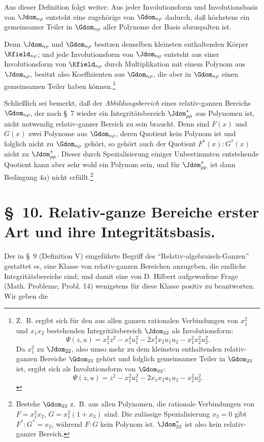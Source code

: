 \documentclass[11pt]{article}
\begin{document}
Aus dieser Definition folgt weiter: Aus jeder Involutionsform und Involutionsbasis von $\Jdom_{n\rho}$ entsteht eine zugehörige von $\Gdom_{n\rho}$ dadurch, daß höchstens ein gemeinsamer Teiler in $\Gdom_{n\rho}$ aller Polynome der Basis abzuspalten ist.

Denn $\Jdom_{n\rho}$ und $\Gdom_{n\rho}$ besitzen denselben kleinsten enthaltenden Körper $\Kfield_{n\rho}$; und jede Involutionsform von $\Jdom_{n\rho}$ entsteht aus einer Involutionsform von $\Kfield_{n\rho}$ durch Multiplikation mit einem Polynom aus $\Jdom_{n\rho}$, besitzt also Koeffizienten aus $\Gdom_{n\rho}$, die aber in $\Gdom_{n\rho}$ einen gemeinsamen Teiler haben können.\footnote{Z.~B. ergibt sich für den aus allen ganzen rationalen Verbindungen von $x_1^2$ und $x_1x_2$ bestehenden Integritätsbereich $\Jdom_{22}$ als Involutionsform:
\[
\Psi(z,u)=x_1^2z^2-x_1^4u_1^2-2x_1^3x_2u_1u_2-x_1^2x_2^2u_2^2.
\]
Da $x_1^2$ zu $\Jdom_{22}$, also umso mehr zu dem kleinsten enthaltenden relativ-ganzen Bereiche $\Gdom_{22}$ gehört und folglich gemeinsamer Teiler in $\Gdom_{22}$ ist, ergibt sich als Involutionsform von $\Gdom_{22}$:
\[
\Psi(z,u)=z^2-x_1^2u_1^2-2x_1x_2u_1u_2-x_2^2u_2^2.
\]}

Schließlich sei bemerkt, daß der \emph{Abbildungsbereich} eines relativ-ganzen Bereichs $\Gdom_{n\rho}$, der nach \S\ 7 wieder ein Integritätsbereich $\Jdom^*_{\rho\rho}$ aus Polynomen ist, nicht notwendig relativ-ganzer Bereich zu sein braucht. Denn sind $F(x)$ und $G(x)$ zwei Polynome aus $\Gdom_{n\rho}$, deren Quotient kein Polynom ist und folglich nicht zu $\Gdom_{n\rho}$ gehört, so gehört auch der Quotient $F^*(x):G^*(x)$ nicht zu $\Jdom^*_{\rho\rho}$. Dieser durch Spezialisierung einiger Unbestimmten entstehende Quotient kann aber sehr wohl ein Polynom sein, und für $\Jdom^*_{\rho\rho}$ ist dann Bedingung 4a) nicht erfüllt.\footnote{Bestehe $\Gdom_{22}$ z.~B. aus allen Polynomen, die rationale Verbindungen von $F=x_1^2x_2$, $G=x_1^2(1+x_3)$ sind. Die zulässige Spezialisierung $x_3=0$ gibt $F^*:G^*=x_2$, während $F:G$ kein Polynom ist. $\Jdom^*_{22}$ ist also kein relativ-ganzer Bereich.}

\section*{\S\ 10. Relativ-ganze Bereiche erster Art und ihre Integritätsbasis.}

Der in \S\ 9 (Definition V) eingeführte Begriff des ``Relativ-algebraisch-Ganzen'' gestattet es, eine Klasse von relativ-ganzen Bereichen anzugeben, die endliche Integritätsbereiche sind; und damit eine von D. Hilbert aufgeworfene Frage (Math. Probleme, Probl. 14) wenigstens für diese Klasse positiv zu beantworten. Wir geben die
\end{document}
